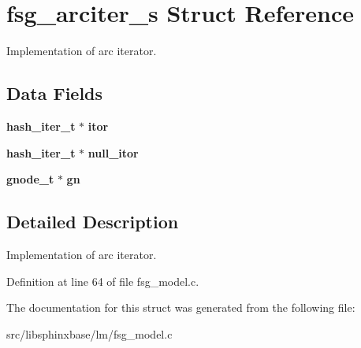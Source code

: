 \section{fsg\+\_\+arciter\+\_\+s Struct Reference}
\label{structfsg__arciter__s}


Implementation of arc iterator.  


\subsection*{Data Fields}
\begin{DoxyCompactItemize}
\item 
\mbox{\label{structfsg__arciter__s_a74aaa5ebff00f4dfe5dfdfe2dc3a1fb4}} 
\textbf{ hash\+\_\+iter\+\_\+t} $\ast$ {\bfseries itor}
\item 
\mbox{\label{structfsg__arciter__s_a9b71932d419732c17820aec91fbc4c0d}} 
\textbf{ hash\+\_\+iter\+\_\+t} $\ast$ {\bfseries null\+\_\+itor}
\item 
\mbox{\label{structfsg__arciter__s_ad11c7f44550802377bb684620c43826a}} 
\textbf{ gnode\+\_\+t} $\ast$ {\bfseries gn}
\end{DoxyCompactItemize}


\subsection{Detailed Description}
Implementation of arc iterator. 

Definition at line 64 of file fsg\+\_\+model.\+c.



The documentation for this struct was generated from the following file\+:\begin{DoxyCompactItemize}
\item 
src/libsphinxbase/lm/fsg\+\_\+model.\+c\end{DoxyCompactItemize}
